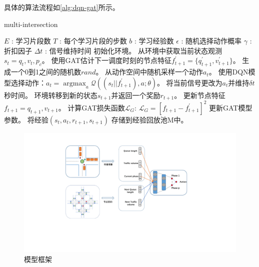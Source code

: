 具体的算法流程如\autoref{alg:dqn-gat}所示。
\begin{breakablealgorithm}
  \caption{multi-intersection}
  \label{alg:dqn-gat}
  \begin{algorithmic}[1] %
      \Require 
      $E$ : 学习片段数 \newline
      $T$ : 每个学习片段的步数 \newline
      $b$ : 学习经验数 \newline
      $\epsilon$ : 随机选择动作概率 \newline
      $\gamma$ : 折扣因子 \newline
      $\Delta t$ : 信号维持时间
          \State 初始化环境。
              \State 从环境中获取当前状态观测$s_t={q_t, v_t, p_c}$。
              \State 使用GAT估计下一调度时刻的节点特征$f_{t+1}^{\prime}=\{q_{t+1}^{\prime},v_{t+1}^{\prime}\}$。
              \State 生成一个0到1之间的随机数$rand$。
                  \State 从动作空间中随机采样一个动作$a_t$。
              \Else
                  \State 使用DQN模型选择动作：$a_t = \mathop{\arg\max}_a \mathcal{Q}((s_t||f_{t+1}^{\prime}),a;\theta)$。
              \EndIf
              \State 将当前信号更改为$a_t$并维持$\delta t$秒时间。
              \State 环境转移到新的状态$s_{t+1}$并返回一个奖励$r_{t+1}$。
              \State 更新节点特征$f_{t+1}={q_{t+1}, v_{t+1}}$。
              \State 计算GAT损失函数$\mathcal{L}_G$:
              $\mathcal{L}_G = [f_{t+1} - f_{t+1}^{\prime}]^2$
              \State 更新GAT模型参数。
              \State 将经验$(s_t,a_t,r_{t+1},s_{t+1})$ 存储到经验回放池M中。
              \EndIf
          \EndFor
      \EndFor  
  \end{algorithmic}  
\end{breakablealgorithm}  

\begin{figure}[htb]
  \includegraphics[width=1.4\textwidth]{fig/model-framework.pdf}
  \caption{模型框架}
  \label{fig:model-framework}
\end{figure}

